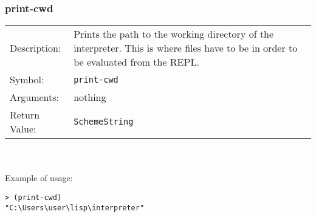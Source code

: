 \documentclass[12pt,a4paper]{scrartcl}
\begin{document}
\subsubsection{print-cwd}
\begin{tabular}{l p{13cm}}
Description: & Prints the path to the working directory of the interpreter. This is where files have to be in order to be evaluated from the REPL. \\
Symbol: & \lstinline{print-cwd}\\
Arguments: & nothing\\
Return Value: & \lstinline{SchemeString}
\end{tabular}
\\
\\
Example of usage:
\begin{lstlisting}
> (print-cwd)
"C:\Users\user\lisp\interpreter"
\end{lstlisting}
\end{document}
